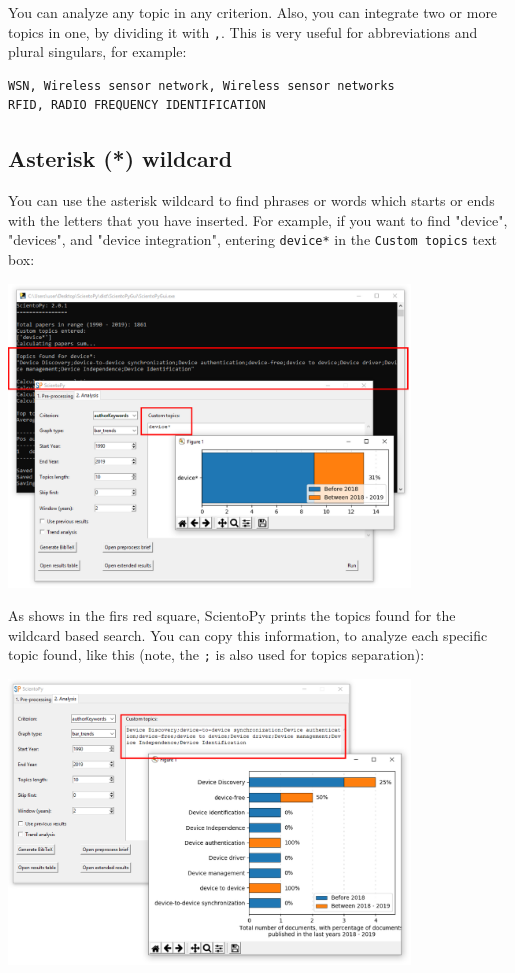 \documentclass[10pt,letterpaper]{article}
\begin{document}
You can analyze any topic in any criterion. Also, you can integrate two or more topics in one, by dividing it with \verb|,|. This is very useful for abbreviations and plural singulars, for example: 
\begin{verbatim}
WSN, Wireless sensor network, Wireless sensor networks
RFID, RADIO FREQUENCY IDENTIFICATION
\end{verbatim}


\subsection{Asterisk (*) wildcard}

You can use the asterisk wildcard to find phrases or words which starts or ends with the letters that you have inserted. For example, if you want to find "device", "devices", and "device integration", entering \verb|device*| in the \verb|Custom topics| text box: 

\begin{center}
	\includegraphics[width=0.8\textwidth]{./figures/win_analysis4.eps}
\end{center}

As shows in the firs red square, ScientoPy prints the topics found for the wildcard based search. You can copy this information, to analyze each specific topic found, like this (note, the \verb|;| is also used for topics separation): 
\begin{center}
	\includegraphics[width=0.8\textwidth]{./figures/win_analysis5.eps}
\end{center}
\end{document}
